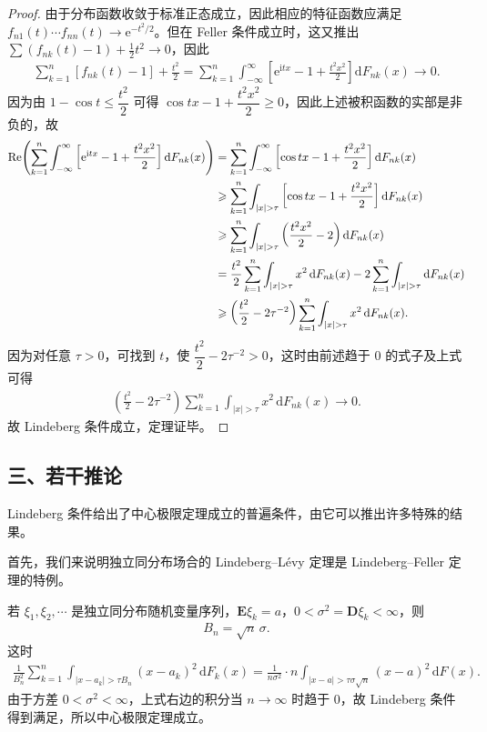 \documentclass[../../main.tex]{subfiles}
\begin{document}
\begin{proof}
由于分布函数收敛于标准正态成立，因此相应的特征函数应满足 $f_{n1}(t)\cdots f_{nn}(t)\to\mathrm{e}^{-t^{2}/2}$。但在 Feller 条件成立时，这又推出 $\sum(f_{nk}(t)-1)+\frac12t^{2}\to0$，因此
\begin{align}
\sum_{k=1}^{n}[f_{nk}(t)-1]+\frac{t^{2}}2
=\sum_{k=1}^{n}\int_{-\infty}^{\infty}\left[\mathrm{e}^{\mathrm{i}tx}-1+\frac{t^{2}x^{2}}2\right]\mathrm{d}F_{nk}(x)\to0.
\end{align}
因为由 $1-\cos t\leqslant\dfrac{t^{2}}2$ 可得 $\cos tx-1+\dfrac{t^{2}x^{2}}2\geqslant0$，因此上述被积函数的实部是非负的，故
\begin{align}
\operatorname{Re}\!\left(\sum_{k=1}^{n}\int_{-\infty}^{\infty}\left[\mathrm{e}^{\mathrm{i}tx}-1+\frac{t^{2}x^{2}}2\right]\mathrm{d}F_{nk}(x)\right)
&=\sum_{k=1}^{n}\int_{-\infty}^{\infty}\left[\cos tx-1+\frac{t^{2}x^{2}}2\right]\mathrm{d}F_{nk}(x)\notag\\
&\geqslant\sum_{k=1}^{n}\int_{|x|>\tau}\left[\cos tx-1+\frac{t^{2}x^{2}}2\right]\mathrm{d}F_{nk}(x)\notag\\
&\geqslant\sum_{k=1}^{n}\int_{|x|>\tau}\left(\frac{t^{2}x^{2}}2-2\right)\mathrm{d}F_{nk}(x)\notag\\
&=\frac{t^{2}}2\sum_{k=1}^{n}\int_{|x|>\tau}x^{2}\,\mathrm{d}F_{nk}(x)-2\sum_{k=1}^{n}\int_{|x|>\tau}\mathrm{d}F_{nk}(x)\notag\\
&\geqslant\left(\frac{t^{2}}2-2\tau^{-2}\right)\sum_{k=1}^{n}\int_{|x|>\tau}x^{2}\,\mathrm{d}F_{nk}(x).
\end{align}
因为对任意 $\tau>0$，可找到 $t$，使 $\dfrac{t^{2}}2-2\tau^{-2}>0$，这时由前述趋于 $0$ 的式子及上式可得
\begin{align*}
\left(\frac{t^{2}}2-2\tau^{-2}\right)\sum_{k=1}^{n}\int_{|x|>\tau}x^{2}\,\mathrm{d}F_{nk}(x)\to0.
\end{align*}
故 Lindeberg 条件成立，定理证毕。
\end{proof}

\subsection*{三、若干推论}

Lindeberg 条件给出了中心极限定理成立的普遍条件，由它可以推出许多特殊的结果。

首先，我们来说明独立同分布场合的 Lindeberg--Lévy 定理是 Lindeberg--Feller 定理的特例。

若 $\xi_1,\xi_2,\cdots$ 是独立同分布随机变量序列，$\boldsymbol{E}\xi_k=a$，$0<\sigma^{2}=\boldsymbol{D}\xi_k<\infty$，则
\begin{align}
B_n=\sqrt{n}\,\sigma.
\end{align}
这时
\begin{align}
\frac{1}{B_n^{2}}\sum_{k=1}^{n}\int_{|x-a_k|>\tau B_n}(x-a_k)^{2}\,\mathrm{d}F_k(x)
=\frac{1}{n\sigma^{2}}\cdot n\int_{|x-a|>\tau\sigma\sqrt{n}}(x-a)^{2}\,\mathrm{d}F(x).
\end{align}
由于方差 $0<\sigma^{2}<\infty$，上式右边的积分当 $n\to\infty$ 时趋于 $0$，故 Lindeberg 条件得到满足，所以中心极限定理成立。
\end{document}
